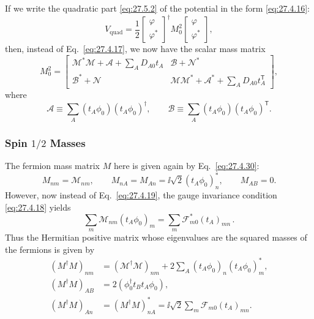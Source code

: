 If we write the quadratic part \eqref{eq:27.5.2} of the potential in the
form \eqref{eq:27.4.16}:
\[
  V_{\mathrm{quad}}
  =\frac12
  \begin{bmatrix}\varphi\\ \varphi^*\end{bmatrix}^{\!\dagger}
  M_0^2
  \begin{bmatrix}\varphi\\ \varphi^*\end{bmatrix},
\]
then, instead of Eq.~\eqref{eq:27.4.17}, we now have the scalar mass matrix
\begin{equation}
  M_0^2=
  \begin{bmatrix}
    \mathcal{M}^*\mathcal{M}+\mathcal{A}
      +\sum_A D_{A0}t_A
    &
    \mathcal{B}+\mathcal{N}^*
    \\
    \mathcal{B}^*+\mathcal{N}
    &
    \mathcal{M}\mathcal{M}^*+\mathcal{A}^*
      +\sum_A D_{A0}t_A^{\mathsf T}
  \end{bmatrix},
  \tag{27.5.4}\label{eq:27.5.4}
\end{equation}
where
\[
  \mathcal{A}\equiv
  \sum_A(t_A\phi_0)(t_A\phi_0)^\dagger,
  \qquad
  \mathcal{B}\equiv
  \sum_A(t_A\phi_0)(t_A\phi_0)^{\mathsf T}.
\]

\subsubsection*{Spin \(1/2\) Masses}

The fermion mass matrix \(M\) here is given again by
Eq.~\eqref{eq:27.4.30}:
\[
  M_{nm}=\mathcal{M}_{nm},
  \qquad
  M_{nA}=M_{An}=\ii\sqrt{2}(t_A\phi_0)_n^*,
  \qquad
  M_{AB}=0.
\]
However, now instead of Eq.~\eqref{eq:27.4.19}, the gauge invariance
condition \eqref{eq:27.4.18} yields
\begin{equation}
  \sum_m\mathcal{M}_{nm}(t_A\phi_0)_m
  =\sum_m\mathcal{F}_{m0}^*(t_A)_{mn}\,.
  \tag{27.5.5}\label{eq:27.5.5}
\end{equation}
Thus the Hermitian positive matrix whose eigenvalues are the squared masses
of the fermions is given by
\begin{equation}
  \begin{aligned}
  (M^\dagger M)_{nm}
  &=(\mathcal{M}^\dagger\mathcal{M})_{nm}
    +2\sum_A(t_A\phi_0)_n(t_A\phi_0)_m^*,
  \\
  (M^\dagger M)_{AB}
  &=2(\phi_0^\dagger t_Bt_A\phi_0),
  \\
  (M^\dagger M)_{An}
  &=(M^\dagger M)_{nA}^*
    =\ii\sqrt{2}\sum_m\mathcal{F}_{m0}(t_A)_{mn}.
  \end{aligned}
  \tag{27.5.6}\label{eq:27.5.6}
\end{equation}

